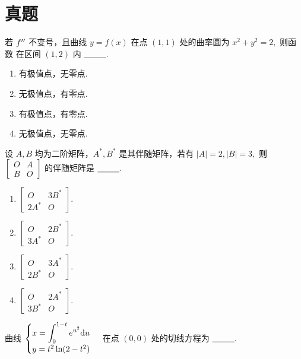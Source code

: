 \chapter{真题}

\begin{quest}[2009T5]
    若 $ f^{\prime\prime} $ 不变号，且曲线 $ y = f(x) $ 在点 $ (1,1) $ 处的曲率圆为 $ x^2+y^2 = 2, $ 则函数
    在区间 $ (1,2) $ 内 $ \underline{~~~~~~~~}. $ 
    \begin{enumerate}
        \item 有极值点，无零点.
        \item 无极值点，有零点.
        \item 有极值点，有零点.
        \item 无极值点，无零点.
    \end{enumerate}
\end{quest}

\begin{quest}[2009T7]
    设 $ A,B $ 均为二阶矩阵，$ A^*,B^* $ 是其伴随矩阵，若有 $ |A| = 2,|B| = 3, $ 则
    $ \begin{bmatrix}
        O&A\\B&O
    \end{bmatrix} $ 的伴随矩阵是 $ \underline{~~~~~~~~}. $ 

    \begin{enumerate}
        \item     
        $ \begin{bmatrix}
            O&3B^*\\2A^*&O
        \end{bmatrix}. $ 
        \item     
        $ \begin{bmatrix}
            O&2B^*\\3A^*&O
        \end{bmatrix}. $
        \item     
        $ \begin{bmatrix}
            O&3A^*\\2B^*&O
        \end{bmatrix}. $
        \item     
        $ \begin{bmatrix}
            O&2A^*\\3B^*&O
        \end{bmatrix}. $
    \end{enumerate}
\end{quest}

\begin{quest}[2009T9]
    曲线 $ \begin{cases}
        x = \displaystyle\int_0^{1-t}e^{u^2}\mathrm{d}u \\ y = t^2\ln(2-t^2)
    \end{cases} $ 在点 $ (0,0) $ 处的切线方程为 $ \underline{~~~~~~~~}. $ 
\end{quest}


